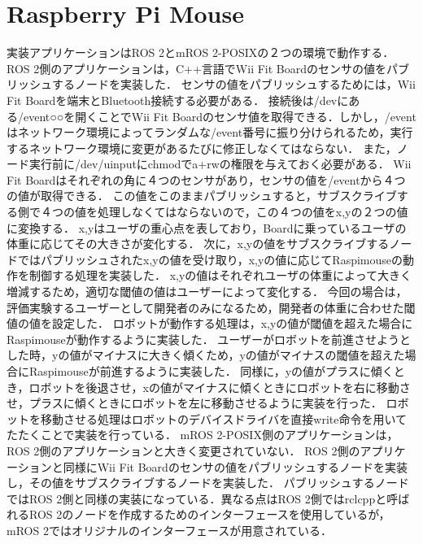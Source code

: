 \section{Raspberry Pi Mouse}
実装アプリケーションはROS 2とmROS 2-POSIXの２つの環境で動作する．
ROS 2側のアプリケーションは，C++言語でWii Fit Boardのセンサの値をパブリッシュするノードを実装した．
センサの値をパブリッシュするためには，Wii Fit Boardを端末とBluetooth接続する必要がある．
接続後は/devにある/event○○を開くことでWii Fit Boardのセンサ値を取得できる．しかし，/eventはネットワーク環境によってランダムな/event番号に振り分けられるため，実行するネットワーク環境に変更があるたびに修正しなくてはならない．
また，ノード実行前に/dev/uinputにchmodでa+rwの権限を与えておく必要がある．
Wii Fit Boardはそれぞれの角に４つのセンサがあり，センサの値を/eventから４つの値が取得できる．
この値をこのままパブリッシュすると，サブスクライブする側で４つの値を処理しなくてはならないので，この４つの値をx,yの２つの値に変換する．
x,yはユーザの重心点を表しており，Boardに乗っているユーザの体重に応じてその大きさが変化する．
次に，x,yの値をサブスクライブするノードではパブリッシュされたx,yの値を受け取り，x,yの値に応じてRaspimouseの動作を制御する処理を実装した．
x,yの値はそれぞれユーザの体重によって大きく増減するため，適切な閾値の値はユーザーによって変化する．
今回の場合は，評価実験するユーザーとして開発者のみになるため，開発者の体重に合わせた閾値の値を設定した．
ロボットが動作する処理は，x,yの値が閾値を超えた場合にRaspimouseが動作するように実装した．
ユーザーがロボットを前進させようとした時，yの値がマイナスに大きく傾くため，yの値がマイナスの閾値を超えた場合にRaspimouseが前進するように実装した．
同様に，yの値がプラスに傾くとき，ロボットを後退させ，xの値がマイナスに傾くときにロボットを右に移動させ，プラスに傾くときにロボットを左に移動させるように実装を行った．
ロボットを移動させる処理はロボットのデバイスドライバを直接write命令を用いてたたくことで実装を行っている．
mROS 2-POSIX側のアプリケーションは，ROS 2側のアプリケーションと大きく変更されていない．
ROS 2側のアプリケーションと同様にWii Fit Boardのセンサの値をパブリッシュするノードを実装し，その値をサブスクライブするノードを実装した．
パブリッシュするノードではROS 2側と同様の実装になっている．異なる点はROS 2側ではrclcppと呼ばれるROS 2のノードを作成するためのインターフェースを使用しているが，mROS 2ではオリジナルのインターフェースが用意されている．
